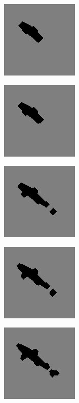 \documentclass{article}
\begin{document}
\begin{figure}[h]
\caption{}
\centering
\includegraphics{images/rebuilt_image8.jpg}
\end{figure}

\begin{figure}[h]
\caption{}
\centering
\includegraphics{images/rebuilt_image7.jpg}
\end{figure}

\begin{figure}[h]
\caption{}
\centering
\includegraphics{images/rebuilt_image6.jpg}
\end{figure}

\begin{figure}[h]
\caption{}
\centering
\includegraphics{images/rebuilt_image5.jpg}
\end{figure}

\begin{figure}[h]
\caption{}
\centering
\includegraphics{images/rebuilt_image4.jpg}
\end{figure}
\end{document}
